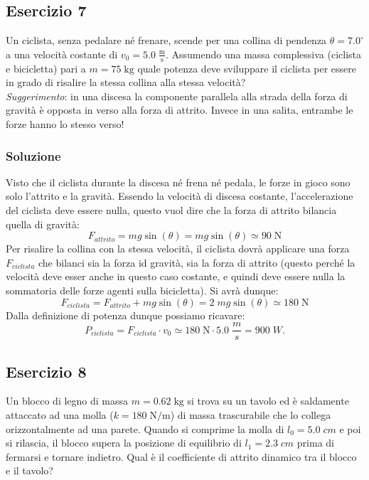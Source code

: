 \documentclass[12pt,a4paper]{book}
\begin{document}
\subsection*{Esercizio 7}
Un ciclista, senza pedalare né frenare, scende per una collina di pendenza $\theta=7.0^{\circ}$ a una velocità costante di $v_{0}=5.0\;\frac{\text{m}}{\text{s}}$. Assumendo una massa complessiva (ciclista e bicicletta) pari a $m=75\; \text{kg}$ quale potenza deve sviluppare il ciclista per essere in grado di risalire la stessa collina alla stessa velocità?\\
\textit{Suggerimento}: in una discesa la componente parallela alla strada della forza di gravità è opposta in verso alla forza di attrito. Invece in una salita, entrambe le forze hanno lo stesso verso! 

\subsubsection*{Soluzione}
Visto che il ciclista durante la discesa né frena né pedala, le forze in gioco sono solo l'attrito e la gravità. Essendo la velocità di discesa costante, l'accelerazione del ciclista deve essere nulla, questo vuol dire che la forza di attrito bilancia quella di gravità:
\begin{equation*}
F_{attrito}=mg \sin(\theta)=mg\sin(\theta) \simeq 90 \; \text{N}
\end{equation*}
Per risalire la collina con la stessa velocità, il ciclista dovrà applicare una forza $F_{ciclista}$ che bilanci sia la forza id gravità, sia la forza di attrito (questo perché la velocità deve esser anche in questo caso costante, e quindi deve essere nulla la sommatoria delle forze agenti sulla bicicletta). Si avrà dunque:
\begin{equation*}
F_{ciclista}=F_{attrito}+ mg \sin(\theta)=2\; mg\sin(\theta)\simeq 180 \; \text{N}
\end{equation*}
Dalla definizione di potenza dunque possiamo ricavare:
\begin{equation*}
P_{ciclista}=F_{ciclista}\cdot v_{0} \simeq 180\; \text{N} \cdot 5.0\; \frac{m}{s}= 900\; W. 
\end{equation*}

\subsection*{Esercizio 8}
Un blocco di legno di massa $m=0.62\; \text{kg}$ si trova su un tavolo ed è saldamente attaccato ad una molla ($k=180\; \text{N}/\text{m}$) di massa trascurabile che lo collega orizzontalmente ad una parete. Quando si comprime la molla di $l_0=5.0\; cm$ e poi si rilascia, il blocco supera la posizione di equilibrio di $l_1=2.3\;cm$ prima di fermarsi e tornare indietro. Qual è il coefficiente di attrito dinamico tra il blocco e il tavolo?
\end{document}
